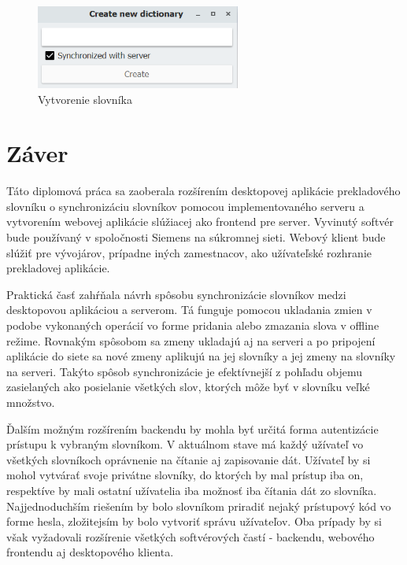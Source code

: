 \documentclass[
  digital, %
  table,   %
  lof,     %
  lot,     %
]{fithesis3}
\begin{document}
\begin{figure}
	\begin{center}
	\includegraphics[width=0.6\textwidth]{img/desktop-ispublic.png}
	\end{center}
    \caption{Vytvorenie slovníka}
	\label{fig:desktop-ispublic}
\end{figure}

\chapter{Záver}
Táto diplomová práca sa zaoberala rozšírením desktopovej aplikácie prekladového slovníku o synchronizáciu slovníkov pomocou implementovaného serveru a vytvorením webovej aplikácie slúžiacej ako frontend pre server. Vyvinutý softvér bude používaný v spoločnosti Siemens na súkromnej sieti. Webový klient bude slúžiť pre vývojárov, prípadne iných zamestnacov, ako užívateľské rozhranie prekladovej aplikácie.

Praktická časť zahŕňala návrh spôsobu synchronizácie slovníkov medzi desktopovou aplikáciou a serverom. Tá funguje pomocou ukladania zmien v podobe vykonaných operácií vo forme pridania alebo zmazania slova v offline režime. Rovnakým spôsobom sa zmeny ukladajú aj na serveri a po pripojení aplikácie do siete sa nové zmeny aplikujú na jej slovníky a jej zmeny na slovníky na serveri. Takýto spôsob synchronizácie je efektívnejší z pohľadu objemu zasielaných ako posielanie všetkých slov, ktorých môže byť v slovníku veľké množstvo.

Ďalším možným rozšírením backendu by mohla byť určitá forma autentizácie prístupu k vybraným slovníkom. V aktuálnom stave má každý užívateľ vo všetkých slovníkoch oprávnenie na čítanie aj zapisovanie dát. Užívateľ by si mohol vytvárať svoje privátne slovníky, do ktorých by mal prístup iba on, respektíve by mali ostatní užívatelia iba možnosť iba čítania dát zo slovníka. Najjednoduchším riešením by bolo slovníkom priradiť nejaký prístupový kód vo forme hesla, zložitejsím by bolo vytvoriť správu užívateľov. Oba prípady by si však vyžadovali rozšírenie všetkých softvérových častí - backendu, webového frontendu aj desktopového klienta.
\end{document}
